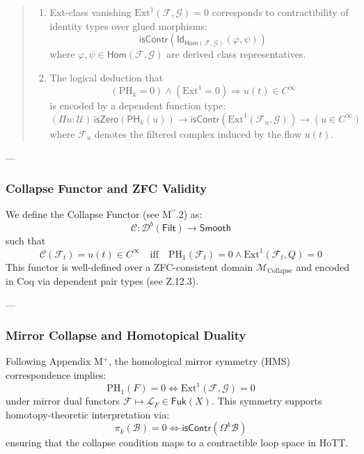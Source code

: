 \documentclass[11pt]{article}
\begin{document}
\begin{axiom}
\begin{axiom}
{{\begin{quote}
\begin{enumerate}
  \item Ext-class vanishing \( \mathrm{Ext}^1(\mathcal{F}, \mathcal{G}) = 0 \) corresponds to contractibility of identity types over glued morphisms:  
  \[
  \mathsf{isContr}\left( \mathsf{Id}_{\mathsf{Hom}(\mathcal{F}, \mathcal{G})}(\varphi, \psi) \right)
  \]
  where \( \varphi, \psi \in \mathsf{Hom}(\mathcal{F}, \mathcal{G}) \) are derived class representatives.

  \item The logical deduction that  
  \[
  (\mathrm{PH}_k = 0) \wedge (\mathrm{Ext}^1 = 0) \Rightarrow u(t) \in C^\infty
  \]
  is encoded by a dependent function type:
  \[
  (\Pi u : \mathcal{U})\, \mathsf{isZero}(\mathsf{PH}_k(u)) \to \mathsf{isContr}(\mathrm{Ext}^1(\mathcal{F}_u, \mathcal{G})) \to (u \in C^\infty)
  \]
  where \( \mathcal{F}_u \) denotes the filtered complex induced by the flow \( u(t) \).
\end{enumerate}
\end{quote}

---

\subsubsection*{Collapse Functor and ZFC Validity}

We define the Collapse Functor (see M$^{\prime\prime}$.2) as:
\[
\mathcal{C} : \mathcal{D}^b(\mathsf{Filt}) \to \mathsf{Smooth}
\]
such that
\[
\mathcal{C}(\mathcal{F}_t) = u(t) \in C^\infty \quad \text{iff} \quad \mathrm{PH}_1(\mathcal{F}_t) = 0 \land \mathrm{Ext}^1(\mathcal{F}_t, Q) = 0
\]
This functor is well-defined over a ZFC-consistent domain \(\mathcal{M}_{\text{Collapse}}\)  
and encoded in Coq via dependent pair types (see Z.12.3).

---

\subsubsection*{Mirror Collapse and Homotopical Duality}

Following Appendix M$^+$, the homological mirror symmetry (HMS) correspondence implies:
\[
\mathrm{PH}_1(F) = 0 \iff \mathrm{Ext}^1(\mathcal{F}, \mathcal{G}) = 0
\]
under mirror dual functors \( \mathcal{F} \mapsto \mathcal{L}_F \in \mathsf{Fuk}(X) \).  
This symmetry supports homotopy-theoretic interpretation via:
\[
\pi_k(\mathcal{B}) = 0 \iff \mathsf{isContr}(\Omega^k \mathcal{B})
\]
ensuring that the collapse condition maps to a contractible loop space in HoTT.

}}
\end{axiom}
\end{axiom}
\end{document}
